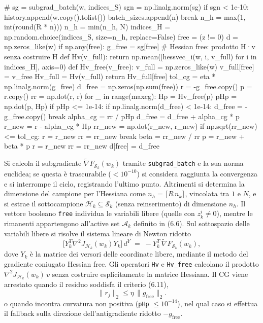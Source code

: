 \documentclass[italian, a4paper, twoside, binding=6mm]{sapthesis}
\begin{document}
\begin{pythoncode}[title= Newton-L1]

#
        sg = subgrad_batch(w, indices_S)
        sgn = np.linalg.norm(sg)
        if sgn < 1e-10:
            history.append(w.copy().tolist())
            batch_sizes.append(n)
            break
        n_h = max(1, int(round(R * n)))
        n_h = min(n_h, N)
        indices_H = np.random.choice(indices_S, size=n_h, replace=False)
        free = (z != 0)
        d = np.zeros_like(w)
        if np.any(free):
            g_free = sg[free]
            # Hessian free: prodotto H·v senza costruire H 
            def Hv(v_full):
                return np.mean([hessvec_i(w, i, v_full) for i in indices_H], axis=0)
            def Hv_free(v_free):
                v_full = np.zeros_like(w)
                v_full[free] = v_free
                Hv_full = Hv(v_full)
                return Hv_full[free]
            tol_cg = eta * np.linalg.norm(g_free)
            d_free = np.zeros(np.sum(free))
            r = -g_free.copy()
            p = r.copy()
            rr = np.dot(r, r)
            for _ in range(maxcg):
                Hp = Hv_free(p)
                pHp = np.dot(p, Hp)
                if pHp <= 1e-14:
                    if np.linalg.norm(d_free) < 1e-14:
                        d_free = -g_free.copy()
                    break
                alpha_cg = rr / pHp
                d_free = d_free + alpha_cg * p
                r_new = r - alpha_cg * Hp
                rr_new = np.dot(r_new, r_new)
                if np.sqrt(rr_new) <= tol_cg:
                    r = r_new
                    rr = rr_new
                    break
                beta = rr_new / rr
                p = r_new + beta * p
                r = r_new
                rr = rr_new
            d[free] = d_free
\end{pythoncode}
Si calcola il subgradiente $\widetilde{\nabla} F_{\mathcal{S}_k}(w_k)$ tramite \texttt{subgrad\_batch} e la sua norma euclidea; se questa è trascurabile ($<10^{-10}$) si considera raggiunta la convergenza e si interrompe il ciclo, registrando l'ultimo punto. Altrimenti si determina la dimensione del campione per l'Hessiana come $n_h=\lceil R\,n_k\rceil$, vincolata tra $1$ e $N$, e si estrae il sottocampione $\mathcal{H}_k\subseteq\mathcal{S}_k$ (senza reinserimento) di dimensione $n_h$. Il vettore booleano \texttt{free} individua le variabili libere (quelle con $z_k^i\neq 0$), mentre le rimanenti appartengono all'active set $\mathcal{A}_k$ definito in (6.6). Sul sottospazio delle variabili libere si risolve il sistema lineare di Newton ridotto
\[
\bigl[Y_k^T \nabla^2 J_{\mathcal{H}_k}(w_k) Y_k\bigr]\,d^Y \;=\; -Y_k^T\,\widetilde{\nabla}F_{\mathcal{S}_k}(w_k),
\]
dove $Y_k$ è la matrice dei versori delle coordinate libere, mediante il metodo del gradiente coniugato Hessian free. Gli operatori \texttt{Hv} e \texttt{Hv\_free} calcolano il prodotto $\nabla^2 J_{\mathcal{H}_k}(w_k)\,v$ senza costruire esplicitamente la matrice Hessiana. Il CG viene arrestato quando il residuo soddisfa il criterio (6.11),
\[
\|r_j\|_2 \le \eta\,\|g_{\text{free}}\|_2.
\]
o quando incontra curvatura non positiva (\texttt{pHp} $\le 10^{-14}$), nel qual caso si effettua il fallback sulla direzione dell'antigradiente ridotto $-g_{\text{free}}$.
\end{document}
